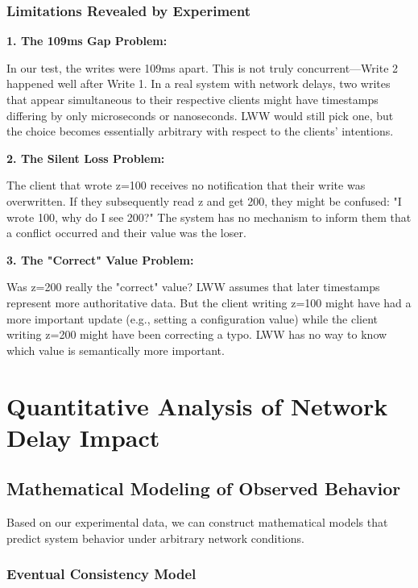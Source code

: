 \documentclass[10pt,a4paper]{article}
\begin{document}
\subsubsection{Limitations Revealed by Experiment}

\textbf{1. The 109ms Gap Problem:}

In our test, the writes were 109ms apart. This is not truly concurrent---Write 2 happened well after Write 1. In a real system with network delays, two writes that appear simultaneous to their respective clients might have timestamps differing by only microseconds or nanoseconds. LWW would still pick one, but the choice becomes essentially arbitrary with respect to the clients' intentions.

\textbf{2. The Silent Loss Problem:}

The client that wrote z=100 receives no notification that their write was overwritten. If they subsequently read z and get 200, they might be confused: "I wrote 100, why do I see 200?" The system has no mechanism to inform them that a conflict occurred and their value was the loser.

\textbf{3. The "Correct" Value Problem:}

Was z=200 really the "correct" value? LWW assumes that later timestamps represent more authoritative data. But the client writing z=100 might have had a more important update (e.g., setting a configuration value) while the client writing z=200 might have been correcting a typo. LWW has no way to know which value is semantically more important.

\newpage

\section{Quantitative Analysis of Network Delay Impact}

\subsection{Mathematical Modeling of Observed Behavior}

Based on our experimental data, we can construct mathematical models that predict system behavior under arbitrary network conditions.

\subsubsection{Eventual Consistency Model}
\end{document}
